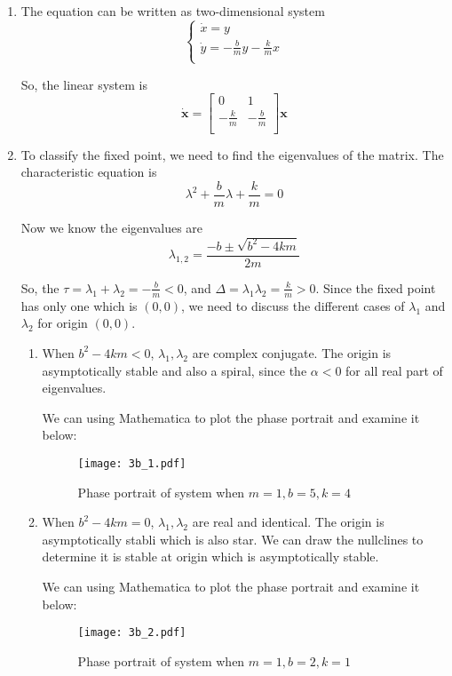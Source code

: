\documentclass[12pt]{exam}
\begin{document}
\begin{enumerate}
	\item The equation can be written as two-dimensional system
	\[ \begin{cases}
		\dot{x} = y \\
		\dot{y} = -\frac{b}{m}y - \frac{k}{m}x \\
	\end{cases} \]

	So, the linear system is
	\[ \dot{\mathbf{x}} = \begin{bmatrix}
		0 & 1 \\
		-\frac{k}{m} & -\frac{b}{m} \\
	\end{bmatrix} \mathbf{x} \]

	\item To classify the fixed point, we need to find the eigenvalues of the matrix. The characteristic equation is 
	\[ \lambda^2 + \frac{b}{m}\lambda + \frac{k}{m} = 0 \]

	Now we know the eigenvalues are
	\[ \lambda_{1,2} = \frac{-b \pm \sqrt{b^2-4km}}{2m} \]

	So, the $\tau = \lambda_1 + \lambda_2 = -\frac{b}{m} < 0$, and $\Delta = \lambda_1 \lambda_2 = \frac{k}{m} > 0$. Since the fixed point has only one which is $(0, 0)$, we need to discuss the different cases of $\lambda_1$ and $\lambda_2$ for origin $(0,0)$.
	\newpage
	\begin{enumerate}
		\item When $b^2-4km < 0$, $\lambda_1, \lambda_2$ are complex conjugate. The origin is asymptotically stable and also a spiral, since the $\alpha < 0$ for all real part of eigenvalues.

			We can using Mathematica to plot the phase portrait and examine it below:
			\begin{figure}[H]
				\centering
				\texttt{[image: 3b\_1.pdf]}
				\caption{Phase portrait of system when $m=1, b=5, k=4$}
				\label{fig:3b_1}
			\end{figure}
		
		\item When $b^2-4km =0$, $\lambda_1, \lambda_2$ are real and identical. The origin is asymptotically stabli which is also star. We can draw the nullclines to determine it is stable at origin which is asymptotically stable.

			We can using Mathematica to plot the phase portrait and examine it below:
			\begin{figure}[H]
				\centering
				\texttt{[image: 3b\_2.pdf]}
				\caption{Phase portrait of system when $m=1, b=2, k=1$}
				\label{fig:3b_2}
			\end{figure}  
			

\end{enumerate}
\end{enumerate}
\end{document}
